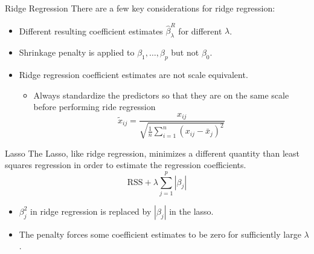 \documentclass[
  ignorenonframetext,
  aspectratio=169,
]{beamer}
\providecommand{\tightlist}{%
  \setlength{\itemsep}{0pt}\setlength{\parskip}{0pt}}\usepackage{longtable,booktabs,array}
\begin{document}
\begin{frame}{Ridge Regression}
\protect\hypertarget{ridge-regression-1}{}
There are a few key considerations for ridge regression:

\begin{itemize}
\item
  Different resulting coefficient estimates
  \(\hat{\beta}_{\lambda}^{R}\) for different \(\lambda\).
\item
  Shrinkage penalty is applied to \(\beta_{1}, \ldots, \beta_{p}\) but
  not \(\beta_0\).
\item
  Ridge regression coefficient estimates are not scale equivalent.

  \begin{itemize}
  \tightlist
  \item
    Always standardize the predictors so that they are on the same scale
    before performing ride regression
    \[\tilde{x}_{i j}=\frac{x_{i j}}{\sqrt{\frac{1}{n} \sum_{i=1}^{n}\left(x_{i j}-\bar{x}_{j}\right)^{2}}}\]
  \end{itemize}
\end{itemize}
\end{frame}

\begin{frame}{Lasso}
\protect\hypertarget{lasso}{}
The Lasso, like ridge regression, minimizes a different quantity than
least squares regression in order to estimate the regression
coefficients.
\[\mathrm{RSS}+\lambda \sum_{j=1}^{p}\left|\beta_{j}\right|\]

\begin{itemize}
\item
  \(\beta_j^2\) in ridge regression is replaced by
  \(\left|\beta_{j}\right|\) in the lasso.
\item
  The penalty forces some coefficient estimates to be zero for
  sufficiently large \(\lambda\).
\end{itemize}
\end{frame}
\end{document}
